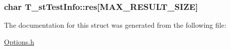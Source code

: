 \hypertarget{structT__stTestInfo_aa38c547822e2dc65413e36b01a0c146b}{
\subsubsection[{res}]{\setlength{\rightskip}{0pt plus 5cm}char T\-\_\-st\-Test\-Info\-::res\mbox{[}{\bf M\-A\-X\-\_\-\-R\-E\-S\-U\-L\-T\-\_\-\-S\-I\-Z\-E}\mbox{]}}}\label{structT__stTestInfo_aa38c547822e2dc65413e36b01a0c146b}


The documentation for this struct was generated from the following file\-:\begin{DoxyCompactItemize}
\item 
\hyperlink{Options_8h}{Options.\-h}\end{DoxyCompactItemize}
